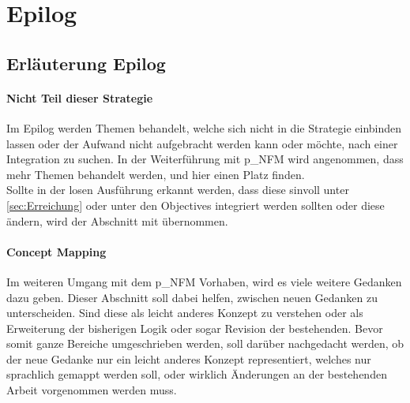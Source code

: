 \section{Epilog}\label{sec:NFMEpilog}

\subsection{Erläuterung Epilog}
\paragraph{Nicht Teil dieser Strategie}
Im Epilog werden Themen behandelt, welche sich nicht in die Strategie einbinden lassen oder der Aufwand nicht aufgebracht werden kann oder möchte, nach einer Integration zu suchen. In der Weiterführung mit \gls{p_NFM} wird angenommen, dass mehr Themen behandelt werden, und hier einen Platz finden.\\

Sollte in der losen Ausführung erkannt werden, dass diese sinvoll unter \ref{sec:Erreichung} oder unter den Objectives integriert werden sollten oder diese ändern, wird der Abschnitt mit übernommen.

\paragraph{Concept Mapping}
Im weiteren Umgang mit dem \gls{p_NFM} Vorhaben, wird es viele weitere Gedanken dazu geben. Dieser Abschnitt soll dabei helfen, zwischen neuen Gedanken zu unterscheiden. Sind diese als leicht anderes Konzept zu verstehen oder als Erweiterung der bisherigen Logik oder sogar Revision der bestehenden. Bevor somit ganze Bereiche umgeschrieben werden, soll darüber nachgedacht werden, ob der neue Gedanke nur ein leicht anderes Konzept representiert, welches nur sprachlich gemappt werden soll, oder wirklich Änderungen an der bestehenden Arbeit vorgenommen werden muss.


